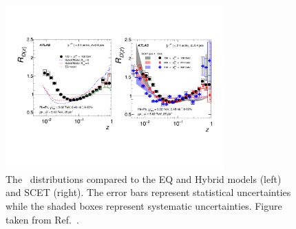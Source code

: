 \begin{figure}[htbp]
\begin{center}
\includegraphics[width=0.75\textwidth]{figures/jetMeasurements/jetff_rdz_theory}
\caption{The \Rdz\ distributions compared to the EQ and Hybrid models (left) and SCET (right).
The error bars represent statistical uncertainties while the shaded boxes represent systematic uncertainties.
Figure taken from Ref.~\cite{PhysRevC.98.024908}.}
\label{fig:jetff_rdz_theory}
\end{center}
\end{figure}



